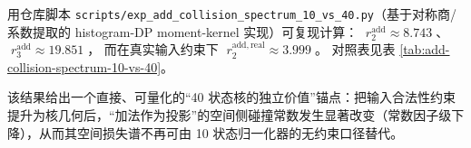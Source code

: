 \begin{remark}\label{rem:add-collision-spectrum-10-vs-40}
用仓库脚本 \texttt{scripts/exp\_add\_collision\_spectrum\_10\_vs\_40.py}（基于对称商/系数提取的 histogram-DP moment-kernel 实现）可复现计算：
\(\;r^{\mathrm{add}}_2\approx 8.743\;\)、
\(\;r^{\mathrm{add}}_3\approx 19.851\;\)，
而在真实输入约束下
\(\;r^{\mathrm{add,real}}_2\approx 3.999\;\)。
对照表见表 \ref{tab:add-collision-spectrum-10-vs-40}。


该结果给出一个直接、可量化的“40 状态核的独立价值”锚点：把输入合法性约束提升为核几何后，“加法作为投影”的空间侧碰撞常数发生显著改变（常数因子级下降），从而其空间损失谱不再可由 10 状态归一化器的无约束口径替代。
\end{remark}

